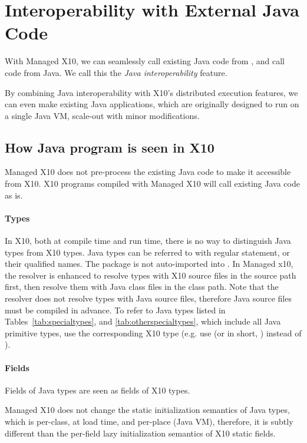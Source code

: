 \section{Interoperability with External Java Code}

With Managed X10, we can seamlessly call existing Java code from \Xten{},
and call \Xten{} code from Java.  We call this the 
\emph{Java interoperability} feature.

By combining Java interoperability with X10's distributed
execution features, we can even make existing Java applications, which
are originally designed to run on a single Java VM, scale-out with
minor modifications.

\subsection{How Java program is seen in X10}

Managed X10 does not pre-process the existing Java code to make it
accessible from X10.  X10 programs compiled with Managed X10 will call
existing Java code as is.

\paragraph{Types}

In X10, both at compile time and run time, there is no way to
distinguish Java types from X10 types.  Java types can be referred to
with regular  statement, or their qualified names.  The
package  is not auto-imported into \Xten.  In Managed
x10, the resolver is enhanced to resolve types with X10 source files
in the source path first, then resolve them with Java class files in
the class path. Note that the resolver does not resolve types with
Java source files, therefore Java source files must be compiled in
advance.  To refer to Java types listed in
Tables~\ref{tab:specialtypes}, and \ref{tab:otherspecialtypes}, which
include all Java primitive types, use the corresponding X10 type
(e.g. use  (or in short, ) instead of
).

\paragraph{Fields}

Fields of Java types are seen as fields of X10 types.

Managed X10 does not change the static initialization semantics of
Java types, which is per-class, at load time, and per-place (Java VM),
therefore, it is subtly different than the per-field lazy
initialization semantics of X10 static fields.

